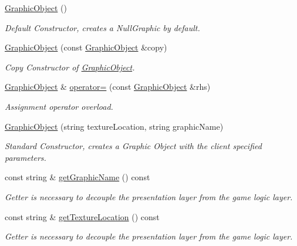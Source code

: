 \begin{DoxyCompactItemize}
\item 
\mbox{\label{class_graphic_object_ae1b56ae4484ad120f5ba77c0b683a045}} 
\hyperlink{class_graphic_object_ae1b56ae4484ad120f5ba77c0b683a045}{Graphic\+Object} ()
\begin{DoxyCompactList}\small\item\em Default Constructor, creates a Null\+Graphic by default. \end{DoxyCompactList}\item 
\mbox{\label{class_graphic_object_a4a14ca7f3b9e9736b0b4231ee08dc0ab}} 
\hyperlink{class_graphic_object_a4a14ca7f3b9e9736b0b4231ee08dc0ab}{Graphic\+Object} (const \hyperlink{class_graphic_object}{Graphic\+Object} \&copy)
\begin{DoxyCompactList}\small\item\em Copy Constructor of \hyperlink{class_graphic_object}{Graphic\+Object}. \end{DoxyCompactList}\item 
\mbox{\label{class_graphic_object_a4026dc4e922a5053b6c0e3d1a9b28b63}} 
\hyperlink{class_graphic_object}{Graphic\+Object} \& \hyperlink{class_graphic_object_a4026dc4e922a5053b6c0e3d1a9b28b63}{operator=} (const \hyperlink{class_graphic_object}{Graphic\+Object} \&rhs)
\begin{DoxyCompactList}\small\item\em Assignment operator overload. \end{DoxyCompactList}\item 
\hyperlink{class_graphic_object_a9819ca0b4c1bb72ede070d8485bfc8a9}{Graphic\+Object} (string texture\+Location, string graphic\+Name)
\begin{DoxyCompactList}\small\item\em Standard Constructor, creates a Graphic Object with the client specified parameters. \end{DoxyCompactList}\item 
const string \& \hyperlink{class_graphic_object_a8772813296b837e997ee21836e92b028}{get\+Graphic\+Name} () const
\begin{DoxyCompactList}\small\item\em Getter is necessary to decouple the presentation layer from the game logic layer. \end{DoxyCompactList}\item 
const string \& \hyperlink{class_graphic_object_a1041a2dd82f82fc724675c5a2ea67d32}{get\+Texture\+Location} () const
\begin{DoxyCompactList}\small\item\em Getter is necessary to decouple the presentation layer from the game logic layer. \end{DoxyCompactList}\end{DoxyCompactItemize}
